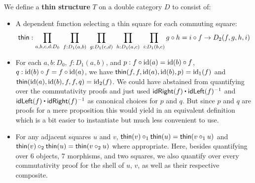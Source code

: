 \begin{defn}
We define a \textbf{thin structure} $T$ on a double category $D$ to consist of:
\begin{itemize}
\item A dependent function selecting a thin square for each commuting square:
\begin{equation*}
\mathsf{thin} : \prod_{a,b,c,d:D_0} ~ \prod_{f:D_1(a,b)} ~ \prod_{g:D_1(c,d)}
	~ \prod_{h:D_1(a,c)} ~ \prod_{i:D_1(b,c)} g \circ h = i \circ f \to
	D_2(f,g,h,i)
\end{equation*}
\item For each $a,b:D_0$, $f:D_1(a,b)$, and $p : f \circ \operatorname{id}(a) = \operatorname{id}(b) \circ f$,
$q : \operatorname{id}(b) \circ f = f \circ \operatorname{id}(a)$, we have $\mathsf{thin}(f,f,\operatorname{id}(a),\operatorname{id}(b),p) =
\operatorname{id}_1(f)$ and $\mathsf{thin}(\operatorname{id}(a),\operatorname{id}(b),f,f,q) = \operatorname{id}_2(f)$.
We could have abstained from quantifying over the commutativity proofs and just
used $\idRight(f) \ct \idLeft(f)\inv$ and $\idLeft(f) \ct \idRight(f)\inv$ as
canonical choices for $p$ and $q$.
But since $p$ and $q$ are proofs for a mere proposition this would yield in an
equivalent definition which is a bit easier to instantiate but much less
convenient to use.
\item For any adjacent squares $u$ and $v$, $\mathsf{thin}(v) \circ_1 \mathsf{thin}(u)
= \mathsf{thin}(v \circ_1 u)$ and $\mathsf{thin}(v) \circ_2 \mathsf{thin}(u) = \mathsf{thin}(v \circ_2 u)$ where
appropriate.
Here, besides quantifying over 6 objects, 7 morphisms, and two squares,
we also quantify over every commutativity proof for the shell of $u$, $v$,
as well as their respective composite.
\end{itemize}
\end{defn}

